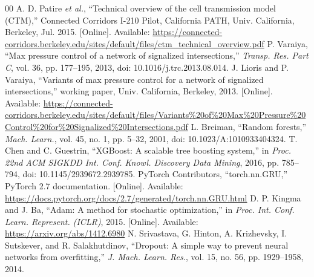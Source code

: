 \documentclass[conference]{IEEEtran}
\begin{document}
\begin{thebibliography}{00}
 A. D. Patire \emph{et al.}, ``Technical overview of the cell transmission model (CTM),'' Connected Corridors I-210 Pilot, California PATH, Univ. California, Berkeley, Jul. 2015. [Online]. Available: \url{https://connected-corridors.berkeley.edu/sites/default/files/ctm_technical_overview.pdf}
 P. Varaiya, ``Max pressure control of a network of signalized intersections,'' \emph{Transp. Res. Part C}, vol. 36, pp. 177--195, 2013, doi: 10.1016/j.trc.2013.08.014.
 J. Lioris and P. Varaiya, ``Variants of max pressure control for a network of signalized intersections,'' working paper, Univ. California, Berkeley, 2013. [Online]. Available: \url{https://connected-corridors.berkeley.edu/sites/default/files/Variants%20of%20Max%20Pressure%20Control%20for%20Signalized%20Intersections.pdf}
 L. Breiman, ``Random forests,'' \emph{Mach. Learn.}, vol. 45, no. 1, pp. 5--32, 2001, doi: 10.1023/A:1010933404324.
 T. Chen and C. Guestrin, ``XGBoost: A scalable tree boosting system,'' in \emph{Proc. 22nd ACM SIGKDD Int. Conf. Knowl. Discovery Data Mining}, 2016, pp. 785--794, doi: 10.1145/2939672.2939785.
 PyTorch Contributors, ``torch.nn.GRU,'' PyTorch 2.7 documentation. [Online]. Available: \url{https://docs.pytorch.org/docs/2.7/generated/torch.nn.GRU.html}
 D. P. Kingma and J. Ba, ``Adam: A method for stochastic optimization,'' in \emph{Proc. Int. Conf. Learn. Represent. (ICLR)}, 2015. [Online]. Available: \url{https://arxiv.org/abs/1412.6980}
 N. Srivastava, G. Hinton, A. Krizhevsky, I. Sutskever, and R. Salakhutdinov, ``Dropout: A simple way to prevent neural networks from overfitting,'' \emph{J. Mach. Learn. Res.}, vol. 15, no. 56, pp. 1929--1958, 2014.
\end{thebibliography}
\end{document}
